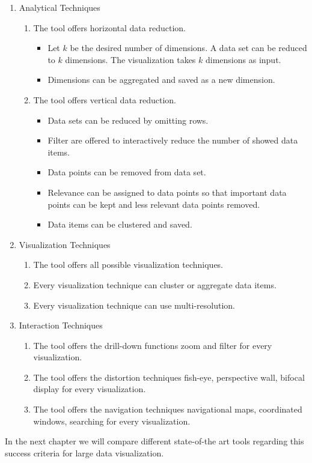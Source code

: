 \begin{enumerate} [noitemsep]
\item Analytical Techniques 
\begin{enumerate}
    \item The tool offers horizontal data reduction.
    \begin{itemize}
        \item Let $k$ be the desired number of dimensions. A data set can be reduced to $k$ dimensions. The visualization takes $k$ dimensions as input.
        \item Dimensions can be aggregated and saved as a new dimension.
    \end{itemize}
    \item The tool offers vertical data reduction.
    \begin{itemize}
        \item Data sets can be reduced by omitting rows.
        \item Filter are offered to interactively reduce the number of showed data items.
        \item Data points can be removed from data set. 
        \item Relevance can be assigned to data points so that important data points can be kept and less relevant data points removed.
        \item Data items can be clustered and saved.  
    \end{itemize}
\end{enumerate}


\item Visualization Techniques
\begin{enumerate}
\item The tool offers all possible visualization techniques.
\item Every visualization technique can cluster or aggregate data items.
\item Every visualization technique can use multi-resolution.
\end{enumerate}

\item Interaction Techniques
\begin{enumerate}
\item The tool offers the drill-down functions zoom and filter for every visualization.
\item The tool offers the distortion techniques fish-eye, perspective wall, bifocal display for every visualization.
\item The tool offers the navigation techniques navigational maps, coordinated windows, searching for every visualization.
\end{enumerate}

\end{enumerate}

In the next chapter we will compare different state-of-the art tools regarding this success criteria for large data visualization.
